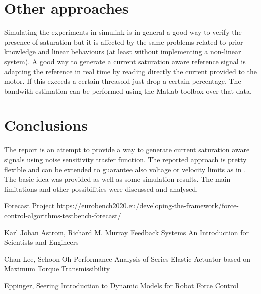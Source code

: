 \documentclass[a4paper,11pt]{article}
\begin{document}
\section{Other approaches}

Simulating the experiments in simulink is in general a good way to verify the presence of saturation but it is affected by the same problems related to prior knowledge and linear behaviours (at least without implementing a non-linear system). A good way to generate a current saturation aware reference signal is adapting the reference in real time by reading directly the current provided to the motor. If this exceeds a certain threasold just drop a certain percentage. The bandwith estimation can be performed using the Matlab toolbox over that data.

\section{Conclusions}
The report is an attempt to provide a way to generate current saturation aware signals using noise sensitivity trasfer function. The reported approach is pretty flexible and can be extended to guarantee also voltage or velocity limits as in \cite{Performance}. The basic idea was provided as well as some simulation results. The main limitations and other possibilities were discussed and analysed.

\begin{thebibliography}{9}

Forecast Project https://eurobench2020.eu/developing-the-framework/force-control-algorithms-testbench-forecast/

Karl Johan Astrom, Richard M. Murray Feedback Systems An Introduction for Scientists and Engineers

Chan Lee, Sehoon Oh Performance Analysis of Series Elastic Actuator based on Maximum Torque Transmissibility

Eppinger, Seering Introduction to Dynamic Models for Robot Force Control 
\end{thebibliography}
\end{document}

